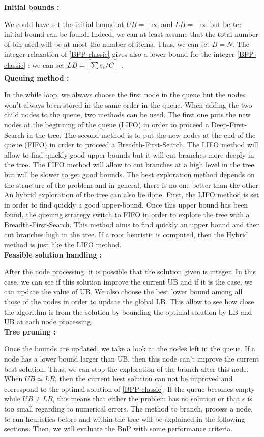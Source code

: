 \noindent\textbf{Initial bounds :}

We could have set the initial bound at $UB = + \infty$ and $LB = -\infty$ but better initial bound can be found. Indeed, we can at least assume that the total number of bin used will be at most the number of items. Thus, we can set $B = N$. The integer relaxation of \eqref{BPP-classic} gives also a lower bound for the integer \eqref{BPP-classic} : we can set $LB = \ceil[\Big]{\sum s_i/C}$ \cite{sadykov2013bin}. \\

\noindent\textbf{Queuing method :}

In the while loop, we always choose the first node in the queue but the nodes won't always been stored in the same order in the queue. When adding the two child nodes to the queue, two methods can be used. The first one puts the new nodes at the beginning of the queue (LIFO) in order to proceed a Deep-First-Search in the tree. The second method is to put the new nodes at the end of the queue (FIFO) in order to proceed a Breadth-First-Search. The LIFO method will allow to find quickly good upper bounds but it will cut branches more deeply in the tree. The FIFO method will allow to cut branches at a high level in the tree but will be slower to get good bounds. The best exploration method depends on the structure of the problem and in general, there is no one better than the other. An hybrid exploration of the tree can also be done. First, the LIFO method is set in order to find quickly a good upper-bound. Once this upper bound has been found, the queuing strategy switch to FIFO in order to explore the tree with a Breadth-First-Search. This method aims to find quickly an upper bound and then cut branches high in the tree. If a root heuristic is computed, then the Hybrid method is just like the LIFO method. \\

\noindent\textbf{Feasible solution handling :}

After the node processing, it is possible that the solution given is integer. In this case, we can see if this solution improve the current UB and if it is the case, we can update the value of UB. We also choose the best lower bound among all those of the nodes in order to update the global LB. This allow to see how close the algorithm is from the solution by bounding the optimal solution by LB and UB at each node processing. \\

\noindent\textbf{Tree pruning :}

Once the bounds are updated, we take a look at the nodes left in the queue. If a node has a lower bound larger than UB, then this node can't improve the current best solution. Thus, we can stop the exploration of the branch after this node. When $UB \simeq LB$, then the current best solution can not be improved and correspond to the optimal solution of \eqref{BPP-classic}. If the queue becomes empty while $UB \neq LB$, this means that either the problem has no solution or that $\epsilon$ is too small regarding to numerical errors. The method to branch, process a node, to run heuristics before and within the tree will be explained in the following sections. Then, we will evaluate the BnP with some performance criteria.